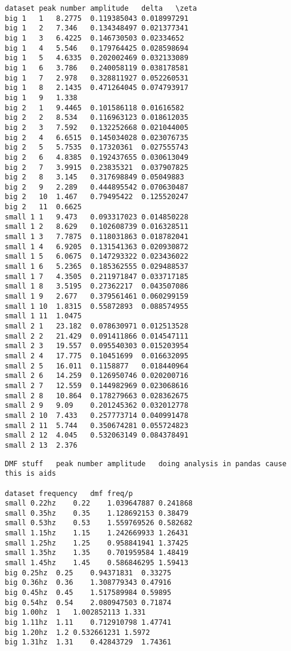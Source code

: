 \begin{verbatim}
dataset	peak number	amplitude	delta	\zeta
big 1	1	8.2775	0.119385043	0.018997291
big 1	2	7.346	0.134348497	0.021377341
big 1	3	6.4225	0.146730503	0.02334652
big 1	4	5.546	0.179764425	0.028598694
big 1	5	4.6335	0.202002469	0.032133089
big 1	6	3.786	0.240058119	0.038178581
big 1	7	2.978	0.328811927	0.052260531
big 1	8	2.1435	0.471264045	0.074793917
big 1	9	1.338		
big 2	1	9.4465	0.101586118	0.01616582
big 2	2	8.534	0.116963123	0.018612035
big 2	3	7.592	0.132252668	0.021044005
big 2	4	6.6515	0.145034028	0.023076735
big 2	5	5.7535	0.17320361	0.027555743
big 2	6	4.8385	0.192437655	0.030613049
big 2	7	3.9915	0.23835321	0.037907825
big 2	8	3.145	0.317698849	0.05049883
big 2	9	2.289	0.444895542	0.070630487
big 2	10	1.467	0.79495422	0.125520247
big 2	11	0.6625		
small 1	1	9.473	0.093317023	0.014850228
small 1	2	8.629	0.102608739	0.016328511
small 1	3	7.7875	0.118031863	0.018782041
small 1	4	6.9205	0.131541363	0.020930872
small 1	5	6.0675	0.147293322	0.023436022
small 1	6	5.2365	0.185362555	0.029488537
small 1	7	4.3505	0.211971847	0.033717185
small 1	8	3.5195	0.27362217	0.043507086
small 1	9	2.677	0.379561461	0.060299159
small 1	10	1.8315	0.55872893	0.088574955
small 1	11	1.0475		
small 2	1	23.182	0.078630971	0.012513528
small 2	2	21.429	0.091411866	0.014547111
small 2	3	19.557	0.095540303	0.015203954
small 2	4	17.775	0.10451699	0.016632095
small 2	5	16.011	0.1158877	0.018440964
small 2	6	14.259	0.126950746	0.020200716
small 2	7	12.559	0.144982969	0.023068616
small 2	8	10.864	0.178279663	0.028362675
small 2	9	9.09	0.201245362	0.032012778
small 2	10	7.433	0.257773714	0.040991478
small 2	11	5.744	0.350674281	0.055724823
small 2	12	4.045	0.532063149	0.084378491
small 2	13	2.376
\end{verbatim}

\begin{verbatim}
DMF stuff	peak number	amplitude	doing analysis in pandas cause this is aids
			
dataset	frequency	dmf	freq/p
small 0.22hz	0.22	1.039647887	0.241868
small 0.35hz	0.35	1.128692153	0.38479
small 0.53hz	0.53	1.559769526	0.582682
small 1.15hz	1.15	1.242669933	1.26431
small 1.25hz	1.25	0.958841941	1.37425
small 1.35hz	1.35	0.701959584	1.48419
small 1.45hz	1.45	0.586846295	1.59413
big 0.25hz	0.25	0.94371831	0.33275
big 0.36hz	0.36	1.308779343	0.47916
big 0.45hz	0.45	1.517589984	0.59895
big 0.54hz	0.54	2.080947503	0.71874
big 1.00hz	1	1.002852113	1.331
big 1.11hz	1.11	0.712910798	1.47741
big 1.20hz	1.2	0.532661231	1.5972
big 1.31hz	1.31	0.42843729	1.74361
\end{verbatim}
